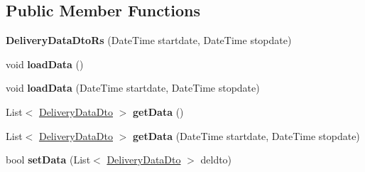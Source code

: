 \subsection*{Public Member Functions}
\begin{DoxyCompactItemize}
\item 
\mbox{\label{classkpi_mvc_api_1_1_data_transfer_objects_1_1_delivery_data_dto_rs_ab4a2e25c208fc08d574771e5054f6f96}} 
{\bfseries Delivery\+Data\+Dto\+Rs} (Date\+Time startdate, Date\+Time stopdate)
\item 
\mbox{\label{classkpi_mvc_api_1_1_data_transfer_objects_1_1_delivery_data_dto_rs_a49d6be9988a6157c75746ca357a44813}} 
void {\bfseries load\+Data} ()
\item 
\mbox{\label{classkpi_mvc_api_1_1_data_transfer_objects_1_1_delivery_data_dto_rs_aab956a92693af48a6da78eab193b9ca7}} 
void {\bfseries load\+Data} (Date\+Time startdate, Date\+Time stopdate)
\item 
\mbox{\label{classkpi_mvc_api_1_1_data_transfer_objects_1_1_delivery_data_dto_rs_a7c771808f4607524b53ee7a65fec5119}} 
List$<$ \hyperlink{classkpi_mvc_api_1_1_data_transfer_objects_1_1_delivery_data_dto}{Delivery\+Data\+Dto} $>$ {\bfseries get\+Data} ()
\item 
\mbox{\label{classkpi_mvc_api_1_1_data_transfer_objects_1_1_delivery_data_dto_rs_a1ba5fe32ae589d5aa5da5e301bfa5356}} 
List$<$ \hyperlink{classkpi_mvc_api_1_1_data_transfer_objects_1_1_delivery_data_dto}{Delivery\+Data\+Dto} $>$ {\bfseries get\+Data} (Date\+Time startdate, Date\+Time stopdate)
\item 
\mbox{\label{classkpi_mvc_api_1_1_data_transfer_objects_1_1_delivery_data_dto_rs_ab7a5599b20fc48614aa3245dc5ee8302}} 
bool {\bfseries set\+Data} (List$<$ \hyperlink{classkpi_mvc_api_1_1_data_transfer_objects_1_1_delivery_data_dto}{Delivery\+Data\+Dto} $>$ deldto)
\item 

\end{DoxyCompactItemize}
